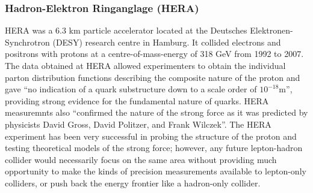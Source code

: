 \subsubsection{Hadron-Elektron Ringanglage (HERA)}
HERA was a 6.3 km particle accelerator located at the Deutsches Elektronen-Synchrotron (DESY) research centre in Hamburg. It collided electrons and positrons with protons at a centre-of-mass-energy of 318 GeV from 1992 to 2007\cite{PHYS:HERA}. The data obtained at HERA allowed experimenters to obtain the individual parton distribution functions describing the composite nature of the proton and gave ``no indication of a quark substructure down to a scale order of $10^{-18}$m''\cite{SPS:HERA}, providing strong evidence for the fundamental nature of quarks. HERA measuremnts also ``confirmed the nature of the strong force as it was predicted by physicists David Gross, David Politzer, and Frank Wilczek''\cite{PHYS:HERA}. The HERA experiment has been very successful in probing the structure of the proton and testing theoretical models of the strong force; however, any future lepton-hadron collider would necessarily focus on the same area without providing much opportunity to make the kinds of precision measurements available to lepton-only colliders, or push back the energy frontier like a hadron-only collider.
